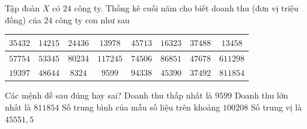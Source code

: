 \begin{ex}%
	Tập đoàn $X$ có $24$ công ty. Thống kê cuối năm cho biết doanh thu (đơn vị triệu đồng) của $24$ công ty con như sau
	\begin{center}
		\begin{tabular}{|c|c|c|c|c|c|c|c|}
			\hline
		$35432$	& $14215$ & $24436$ & $13978$ & $45713$ & $16323$ & $37488$ & $13458$ \\
			\hline
		$57754$	& $53345$ & $80234$ & $117245$ & $74506$ & $86851$ & $47678$ & $611298$ \\
			\hline
		$19397$	& $48644$ & $8324$ & $9599$ & $94338$ & $45390$ & $37492$ & $811854$ \\
			\hline
		\end{tabular}
	\end{center}
Các mệnh đề sau đúng hay sai?
	\choiceTF
	{Doanh thu thấp nhất là $9599$}
	{\True Doanh thu lớn nhất là $811854$}
	{\True Số trung bình của mẫu số liệu trên khoảng $100208$}
	{\True Số trung vị là $45551{,}5$}
\end{ex}

